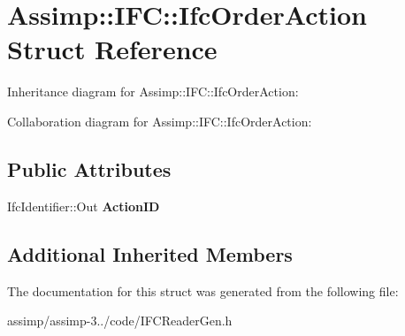 \hypertarget{struct_assimp_1_1_i_f_c_1_1_ifc_order_action}{\section{Assimp\+:\+:I\+F\+C\+:\+:Ifc\+Order\+Action Struct Reference}
\label{struct_assimp_1_1_i_f_c_1_1_ifc_order_action}
}


Inheritance diagram for Assimp\+:\+:I\+F\+C\+:\+:Ifc\+Order\+Action\+:


Collaboration diagram for Assimp\+:\+:I\+F\+C\+:\+:Ifc\+Order\+Action\+:
\subsection*{Public Attributes}
\begin{DoxyCompactItemize}
\item 
\hypertarget{struct_assimp_1_1_i_f_c_1_1_ifc_order_action_a9aaa712de9103401fe12ee36106193a8}{Ifc\+Identifier\+::\+Out {\bfseries Action\+I\+D}}\label{struct_assimp_1_1_i_f_c_1_1_ifc_order_action_a9aaa712de9103401fe12ee36106193a8}

\end{DoxyCompactItemize}
\subsection*{Additional Inherited Members}


The documentation for this struct was generated from the following file\+:\begin{DoxyCompactItemize}
\item 
assimp/assimp-\/3../code/I\+F\+C\+Reader\+Gen.\+h\end{DoxyCompactItemize}
